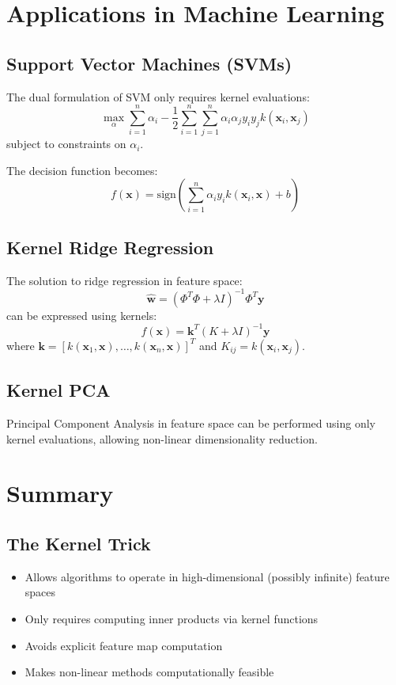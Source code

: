 \documentclass{tufte-handout}
\begin{document}
\section{Applications in Machine Learning}

\subsection{Support Vector Machines (SVMs)}

The dual formulation of SVM only requires kernel evaluations:
\begin{equation}
\max_{\alpha} \sum_{i=1}^{n}\alpha_i - \frac{1}{2}\sum_{i=1}^{n}\sum_{j=1}^{n}\alpha_i\alpha_j y_i y_j k(\mathbf{x}_i, \mathbf{x}_j)
\end{equation}
subject to constraints on $\alpha_i$.

The decision function becomes:
\begin{equation}
f(\mathbf{x}) = \text{sign}\left(\sum_{i=1}^{n}\alpha_i y_i k(\mathbf{x}_i, \mathbf{x}) + b\right)
\end{equation}

\subsection{Kernel Ridge Regression}
The solution to ridge regression in feature space:
\begin{equation}
\hat{\mathbf{w}} = \left(\Phi^T\Phi + \lambda I\right)^{-1}\Phi^T\mathbf{y}
\end{equation}
can be expressed using kernels:
\begin{equation}
f(\mathbf{x}) = \mathbf{k}^T(K + \lambda I)^{-1}\mathbf{y}
\end{equation}
where $\mathbf{k} = [k(\mathbf{x}_1, \mathbf{x}), \ldots, k(\mathbf{x}_n, \mathbf{x})]^T$ and $K_{ij} = k(\mathbf{x}_i, \mathbf{x}_j)$.

\subsection{Kernel PCA}
Principal Component Analysis in feature space can be performed using only kernel evaluations, allowing non-linear dimensionality reduction.

\section{Summary}

\subsection{The Kernel Trick}
\begin{itemize}
    \item Allows algorithms to operate in high-dimensional (possibly infinite) feature spaces
    \item Only requires computing inner products via kernel functions
    \item Avoids explicit feature map computation
    \item Makes non-linear methods computationally feasible
\end{itemize}
\end{document}
